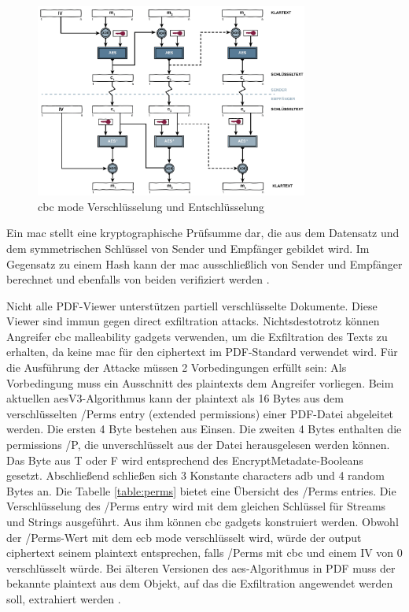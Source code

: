 \begin{figure}[!htbp]
	\centering
	\includegraphics[width=0.8\textwidth]{"images/cbc.png"}
	\caption{\gls{cbc} mode Verschlüsselung und Entschlüsselung \cite{cbc}}
	\label{fig:cbc}
\end{figure}

Ein \gls{mac} stellt eine kryptographische Prüfsumme dar, die aus dem Datensatz und dem symmetrischen Schlüssel von Sender und Empfänger gebildet wird. Im Gegensatz zu einem Hash kann der \gls{mac} ausschließlich von Sender und Empfänger berechnet und ebenfalls von beiden verifiziert werden \cite{crypto-web}.
\par
Nicht alle PDF-Viewer unterstützen partiell verschlüsselte Dokumente. Diese Viewer sind immun gegen direct exfiltration attacks. Nichtsdestotrotz können Angreifer \gls{cbc} malleability gadgets verwenden, um die Exfiltration des Texts zu erhalten, da keine \gls{mac} für den ciphertext im PDF-Standard verwendet wird. Für die Ausführung der Attacke müssen 2 Vorbedingungen erfüllt sein: Als Vorbedingung muss ein Ausschnitt des plaintexts dem Angreifer vorliegen. Beim aktuellen \gls{aes}V3-Algorithmus kann der plaintext als 16 Bytes aus dem verschlüsselten /Perms entry (extended permissions) einer PDF-Datei abgeleitet werden. Die ersten 4 Byte bestehen aus Einsen. Die zweiten 4 Bytes enthalten die permissions /P, die unverschlüsselt aus der Datei herausgelesen werden können. Das Byte aus T oder F wird entsprechend des EncryptMetadate-Booleans gesetzt. Abschließend schließen sich 3 Konstante characters adb und 4 random Bytes an. Die Tabelle \ref{table:perms} bietet eine Übersicht des /Perms entries. Die Verschlüsselung des /Perms entry wird mit dem gleichen Schlüssel für Streams und Strings ausgeführt. Aus ihm können \gls{cbc} gadgets konstruiert werden. Obwohl der /Perms-Wert mit dem \gls{ecb} mode verschlüsselt wird, würde der output ciphertext seinem plaintext entsprechen, falls /Perms mit \gls{cbc} und einem IV von 0 verschlüsselt würde. Bei älteren Versionen des \gls{aes}-Algorithmus in PDF muss der bekannte plaintext aus dem Objekt, auf das die Exfiltration angewendet werden soll, extrahiert werden \cite{ccc-break-pdf, pdfex}.

